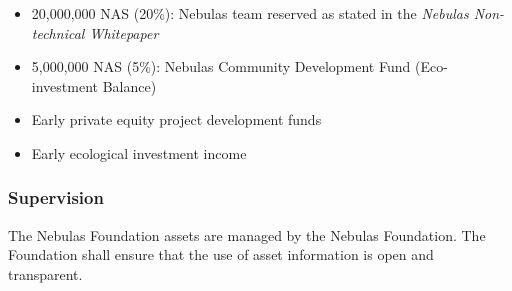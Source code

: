 \begin{itemize}
	\item 20,000,000 NAS (20\%): Nebulas team reserved as stated in the \textit{Nebulas Non-technical Whitepaper}
    \item 5,000,000 NAS (5\%): Nebulas Community Development Fund (Eco-investment Balance)
	\item Early private equity project development funds
	\item Early ecological investment income
\end{itemize}

\subsubsection{Supervision}

The Nebulas Foundation assets are managed by the Nebulas Foundation. The Foundation shall ensure that the use of asset information is open and transparent.
